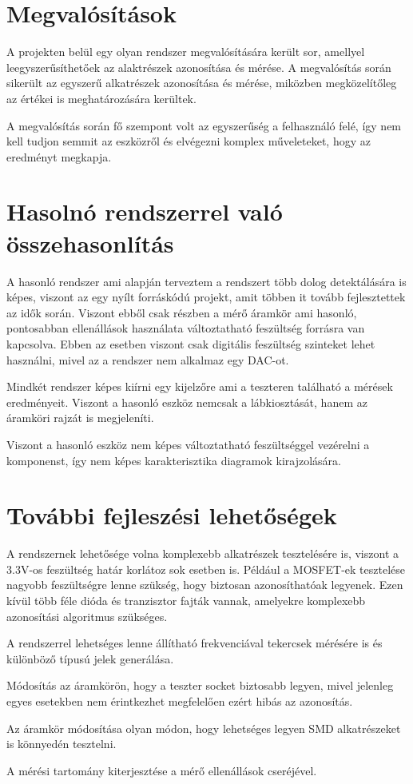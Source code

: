\section{Megvalósítások}

A projekten belül egy olyan rendszer megvalósítására került sor,
amellyel leegyszerűsíthetőek az alaktrészek azonosítása és mérése.
A megvalósítás során sikerült az egyszerű alkatrészek azonosítása
és mérése, miközben megközelítőleg az értékei is meghatározására
kerültek.

A megvalósítás során fő szempont volt az egyszerűség a felhasználó felé,
így nem kell tudjon semmit az eszközről és elvégezni komplex műveleteket,
hogy az eredményt megkapja. 


\section{Hasolnó rendszerrel való összehasonlítás}

A hasonló rendszer ami alapján terveztem a rendszert \cite{similarSystem}
több dolog detektálására is képes, viszont az egy nyílt forráskódú
projekt, amit többen it tovább fejlesztettek az idők során. Viszont
ebből csak részben a mérő áramkör ami hasonló, pontosabban ellenállások
használata változtatható feszültség forrásra van kapcsolva. 
Ebben az esetben viszont csak digitális feszültség szinteket lehet
használni, mivel az a rendszer nem alkalmaz egy DAC-ot.

Mindkét rendszer képes kiírni egy kijelzőre ami a teszteren található
a mérések eredményeit. Viszont a hasonló eszköz nemcsak a lábkiosztását,
hanem az áramköri rajzát is megjeleníti.

Viszont a hasonló eszköz nem képes változtatható feszültséggel vezérelni a
komponenst, így nem képes karakterisztika diagramok kirajzolására.

\section{További fejleszési lehetőségek}

A rendszernek lehetősége volna komplexebb alkatrészek
tesztelésére is, viszont a 3.3V-os feszültség határ
korlátoz sok esetben is. Például a MOSFET-ek tesztelése nagyobb
feszültségre lenne szükség, hogy biztosan azonosíthatóak legyenek.
Ezen kívül több féle dióda és tranzisztor fajták vannak, 
amelyekre komplexebb azonosítási algoritmus szükséges.

A rendszerrel lehetséges lenne állítható frekvenciával tekercsek mérésére
is és különböző típusú jelek generálása.

Módosítás az áramkörön, hogy a teszter socket biztosabb legyen, mivel
jelenleg egyes esetekben nem érintkezhet megfelelően ezért hibás az azonosítás.

Az áramkör módosítása olyan módon, hogy lehetséges legyen SMD alkatrészeket
is könnyedén tesztelni.

A mérési tartomány kiterjesztése a mérő ellenállások cseréjével.




